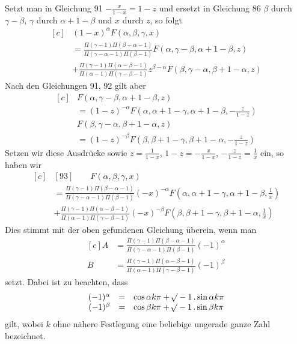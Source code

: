 Setzt man in Gleichung 91 \(-\frac{x}{1-x}=1-z\) und ersetzt in Gleichung 86 \(\beta\) durch \(\gamma-\beta\), \(\gamma\) durch \(\alpha+1-\beta\) und \(x\) durch \(z\), so folgt
\[
\begin{aligned}[c]
&(1-x)^\alpha F(\alpha,\beta,\gamma,x)\\&=
\frac{\Pi(\gamma-1)\Pi(\beta-\alpha-1)}{\Pi(\gamma-\alpha-1)\Pi(\beta-1)}F(\alpha,\gamma-\beta,\alpha+1-\beta,z)\\
&+\frac{\Pi(\gamma-1)\Pi(\alpha-\beta-1)}{\Pi(\alpha-1)\Pi(\gamma-\beta-1)}z^{\beta-\alpha}F(\beta,\gamma-\alpha,\beta+1-\alpha,z)
\end{aligned}
\]
Nach den Gleichungen 91, 92 gilt aber
\[
\begin{aligned}[c]
&F(\alpha,\gamma-\beta,\alpha+1-\beta,z)\\&=(1-z)^{-\alpha}F\left(\alpha,\alpha+1-\gamma,\alpha+1-\beta,-\frac{z}{1-z}\right)\\[5pt]
&F(\beta,\gamma-\alpha,\beta+1-\alpha,z)\\&=(1-z)^{-\beta}F\left(\beta,\beta+1-\gamma,\beta+1-\alpha,-\frac{z}{1-z}\right)
\end{aligned}
\]
Setzen wir diese Ausdrücke sowie \(z=\frac{1}{1-x}\), \(1-z=-\frac{x}{1-x}\), \(-\frac{z}{1-z}=\frac{1}{x}\) ein, so haben wir
\[
\begin{aligned}[c]
&[93]\qquad F(\alpha,\beta,\gamma,x)\\&=
\frac{\Pi(\gamma-1)\Pi(\beta-\alpha-1)}{\Pi(\gamma-\alpha-1)\Pi(\beta-1)}(-x)^{-\alpha}F\left(\alpha,\alpha+1-\gamma,\alpha+1-\beta,\frac{1}{x}\right)\\
&+\frac{\Pi(\gamma-1)\Pi(\alpha-\beta-1)}{\Pi(\alpha-1)\Pi(\gamma-\beta-1)}(-x)^{-\beta}F\left(\beta,\beta+1-\gamma,\beta+1-\alpha,\frac{1}{x}\right)
\end{aligned}
\]
Dies stimmt mit der oben gefundenen Gleichung überein, wenn man
\[
\begin{aligned}[c]
A&=\frac{\Pi(\gamma-1)\Pi(\beta-\alpha-1)}{\Pi(\gamma-\alpha-1)\Pi(\beta-1)}(-1)^\alpha\\
B&=\frac{\Pi(\gamma-1)\Pi(\alpha-\beta-1)}{\Pi(\alpha-1)\Pi(\gamma-\beta-1)}(-1)^\beta
\end{aligned}
\]
setzt.
Dabei ist zu beachten, dass
\[
\begin{array}{rcl}
(-1)^\alpha&=&\cos\alpha k\pi+\mathord{{}^{}\!\surd}-1\,.\sin\alpha k\pi\\
(-1)^\beta&=&\cos\beta k\pi+\mathord{{}^{}\!\surd}-1\,.\sin\beta k\pi
\end{array}
\]
gilt, wobei \(k\) ohne nähere Festlegung eine beliebige ungerade ganze Zahl bezeichnet.

